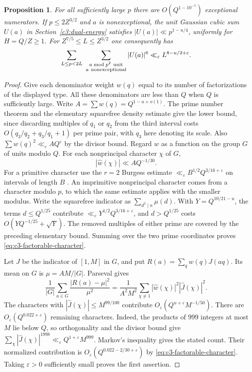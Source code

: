 \documentclass[11pt,letterpaper]{article}
\newtheorem{proposition}[proposition]{Proposition}
\theoremstyle{definition}
\begin{document}
\begin{proposition}\label{c3:factorable-numerators}
For all sufficiently large $p$ there are $O(Q^{1-10^{-5}})$
exceptional numerators. If $p\le 2Z^{3/2}$ and $a$ is
nonexceptional, the unit Gaussian cubic sum $U(a)$ in
Section~\ref{c3:dual-energy} satisfies
$|U(a)|\ll p^{1-u/4}$, uniformly for $H=Q/Z\ge1$.
For $Z^{7/5}\le L\le Z^{3/2}$ one consequently has
\[
 \sum_{L\le p<2L}\ \sum_{\substack{a\bmod p^2\ {\rm unit}\\
                             a\ {\rm nonexceptional}}}|U(a)|^6
                    \ll_\varepsilon L^{8-u/2+\varepsilon}.
\]
\end{proposition}
\begin{proof}
Give each denominator weight $w(q)$ equal to its number of
factorizations of the displayed type. All these denominators are
less than $Q$ when $Q$ is sufficiently large. Write
$A=\sum w(q)=Q^{1-u+o(1)}$. The prime number theorem and the
elementary squarefree density estimate give the lower bound, since
discarding multiples of $q_1$ or $q_2$ from the third interval costs
$O(q_3/q_2+q_3/q_1+1)$ per prime pair, with $q_3$ here denoting its
scale. Also $\sum w(q)^2\ll_\varepsilon A Q^\varepsilon$ by the
divisor bound. Regard $w$ as a function on the group $G$ of units
modulo $Q$. For each nonprincipal character $\chi$ of $G$,
\begin{equation}\label{eq:c3-factorable-character}
 |\widehat w(\chi)|\ll A Q^{-1/30}.
\end{equation}
For a primitive character use the $r=2$ Burgess estimate
$\ll_\varepsilon B^{1/2}Q^{3/16+\varepsilon}$ on intervals of
length $B$ \cite{c3:burgess}. An imprimitive nonprincipal character
comes from a character modulo $p$, to which the same estimate applies
with the smaller modulus. Write the squarefree indicator as
$\sum_{d^2\mid n}\mu(d)$. With $Y=Q^{10/21-u}$, the terms
$d\le Q^{1/25}$ contribute
$\ll_\varepsilon Y^{1/2} Q^{3/16+\varepsilon}$, and
$d>Q^{1/25}$ costs $O(YQ^{-1/25}+\sqrt Y)$. The removed multiples
of either prime are covered by the preceding elementary bound.
Summing over the two prime coordinates proves
\eqref{eq:c3-factorable-character}.

Let $J$ be the indicator of $[1,M]$ in $G$, and put
$R(a)=\sum_{q}w(q)J(aq)$. Its mean on $G$ is
$\mu=AM/|G|$. Parseval gives
\[
 \frac{1}{|G|}\sum_{a\in G}\frac{|R(a)-\mu|^2}{\mu^2}
  =\frac{1}{A^2M^2}\sum_{\chi\ne1}
                         |\widehat w(\chi)|^2|\widehat J(\chi)|^2 .
\]
The characters with $|\widehat J(\chi)|\le M^{99/100}$ contribute
$O_\varepsilon(Q^{u+\varepsilon}M^{-1/50})$. There are
$O_\varepsilon(Q^{0.022+\varepsilon})$ remaining characters.
Indeed, the products of $999$ integers at most $M$ lie below $Q$,
so orthogonality and the divisor bound give
$\sum_\chi|\widehat J(\chi)|^{1998}\ll_\varepsilon
 Q^{1+\varepsilon}M^{999}$. Markov's inequality gives the stated
count. Their normalized contribution is
$O_\varepsilon(Q^{0.022-2/30+\varepsilon})$ by
\eqref{eq:c3-factorable-character}. Taking $\varepsilon>0$
sufficiently small proves the first assertion.


\end{proof}
\end{document}
